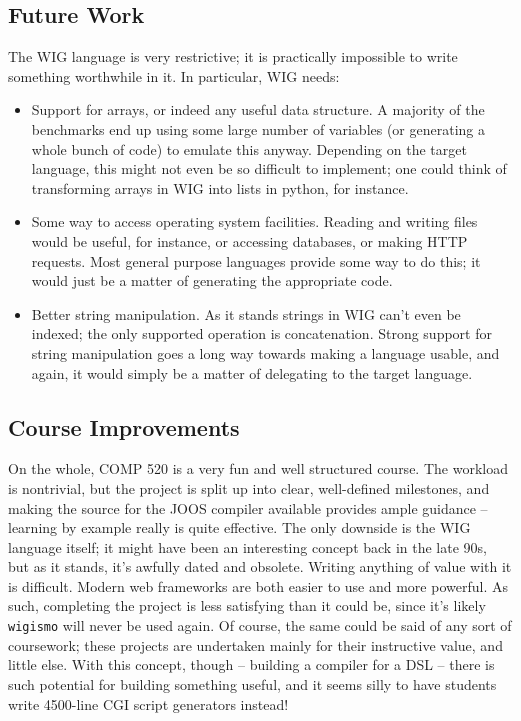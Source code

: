 \documentclass{WigReport}
\begin{document}
\subsection{Future Work}
The WIG language is very restrictive; it is practically impossible to 
write something worthwhile in it. In particular, WIG needs:

\begin{itemize}
\item Support for arrays, or indeed any useful data structure. A majority
of the benchmarks end up using some large number of variables (or 
generating a whole bunch of code) to emulate this anyway. Depending on the
target language, this might not even be so difficult to implement; one
could think of transforming arrays in WIG into lists in python, for
instance.
\item Some way to access operating system facilities. Reading and writing
files would be useful, for instance, or accessing databases, or making
HTTP requests. Most general purpose languages provide some way to do this;
it would just be a matter of generating the appropriate code.
\item Better string manipulation. As it stands strings in WIG can't even
be indexed; the only supported operation is concatenation. Strong support
for string manipulation goes a long way towards making a language usable,
and again, it would simply be a matter of delegating to the target
language.
\end{itemize}

\subsection{Course Improvements}
On the whole, COMP 520 is a very fun and well structured course. The
workload is nontrivial, but the project is split up into clear, 
well-defined milestones, and making the source for the JOOS compiler
available provides ample guidance -- learning by example really is quite
effective. The only downside is the WIG language itself; it might have 
been an interesting concept back in the late 90s, but as it stands, it's 
awfully dated and obsolete. Writing anything of value with it is 
difficult. Modern web frameworks are both easier to use and more powerful.
As such, completing the project is less satisfying than it could be, since
it's likely {\tt wigismo} will never be used again. Of course, the same
could be said of any sort of coursework; these projects are undertaken
mainly for their instructive value, and little else. With this concept,
though -- building a compiler for a DSL -- there is such potential for
building something useful, and it seems silly to have students write
4500-line CGI script generators instead!
\end{document}
